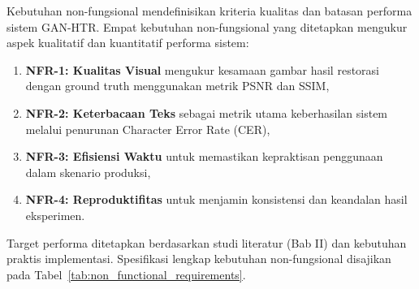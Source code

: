 Kebutuhan non-fungsional mendefinisikan kriteria kualitas dan batasan performa sistem GAN-HTR. Empat kebutuhan non-fungsional yang ditetapkan mengukur aspek kualitatif dan kuantitatif performa sistem:

\begin{enumerate}
    \item \textbf{NFR-1: Kualitas Visual} mengukur kesamaan gambar hasil restorasi dengan ground truth menggunakan metrik PSNR dan SSIM,
    \item \textbf{NFR-2: Keterbacaan Teks} sebagai metrik utama keberhasilan sistem melalui penurunan Character Error Rate (CER),
    \item \textbf{NFR-3: Efisiensi Waktu} untuk memastikan kepraktisan penggunaan dalam skenario produksi,
    \item \textbf{NFR-4: Reproduktifitas} untuk menjamin konsistensi dan keandalan hasil eksperimen.
\end{enumerate}

Target performa ditetapkan berdasarkan studi literatur (Bab II) dan kebutuhan praktis implementasi. Spesifikasi lengkap kebutuhan non-fungsional disajikan pada Tabel~\ref{tab:non_functional_requirements}.

